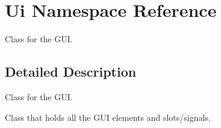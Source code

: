 \hypertarget{namespace_ui}{}\section{Ui Namespace Reference}
\label{namespace_ui}


Class for the G\+UI.  




\subsection{Detailed Description}
Class for the G\+UI. 

Class that holds all the G\+UI elements and slots/signals. 